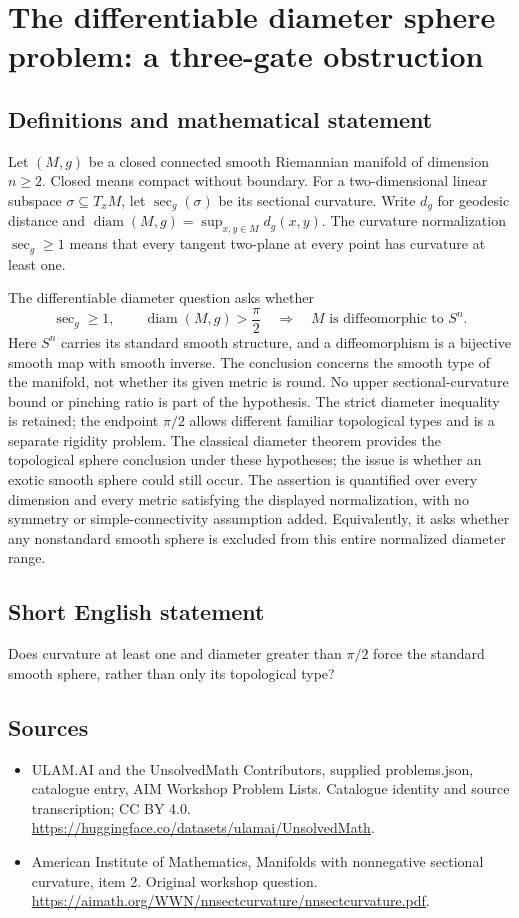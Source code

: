 \documentclass[11pt,a4paper]{article}
\begin{document}
\section*{The differentiable diameter sphere problem: a three-gate obstruction}\label{statement}

\subsection{Definitions and mathematical statement}
Let $(M,g)$ be a closed connected smooth Riemannian manifold of dimension $n\geq2$.
Closed means compact without boundary.
For a two-dimensional linear subspace $\sigma\subseteq T_xM$, let $\sec_g(\sigma)$ be its sectional curvature.
Write $d_g$ for geodesic distance and
$\operatorname{diam}(M,g)=\sup_{x,y\in M}d_g(x,y)$.
The curvature normalization $\sec_g\geq1$ means that every tangent two-plane at every point has curvature at least one.

The differentiable diameter question asks whether
\[
 \sec_g\geq1,\qquad
 \operatorname{diam}(M,g)>\frac\pi2
 \quad\Longrightarrow\quad
 M\text{ is diffeomorphic to }S^n.
\]
Here $S^n$ carries its standard smooth structure, and a diffeomorphism is a bijective smooth map with smooth inverse.
The conclusion concerns the smooth type of the manifold, not whether its given metric is round.
No upper sectional-curvature bound or pinching ratio is part of the hypothesis.
The strict diameter inequality is retained; the endpoint $\pi/2$ allows different familiar topological types and is a separate rigidity problem.
The classical diameter theorem provides the topological sphere conclusion under these hypotheses; the issue is whether an exotic smooth sphere could still occur.
The assertion is quantified over every dimension and every metric satisfying the displayed normalization, with no symmetry or simple-connectivity assumption added.
Equivalently, it asks whether any nonstandard smooth sphere is excluded from this entire normalized diameter range.
\subsection{Short English statement}
Does curvature at least one and diameter greater than $\pi/2$ force the standard smooth sphere, rather than only its topological type?
\subsection{Sources}
\begin{itemize}
\item[S1] ULAM.AI and the UnsolvedMath Contributors, supplied problems.json, catalogue entry, AIM Workshop Problem Lists. Catalogue identity and source transcription; CC BY 4.0.
\url{https://huggingface.co/datasets/ulamai/UnsolvedMath}.
\item[S2] American Institute of Mathematics, Manifolds with nonnegative sectional curvature, item 2. Original workshop question.
\url{https://aimath.org/WWN/nnsectcurvature/nnsectcurvature.pdf}.
\end{itemize}
\end{document}
